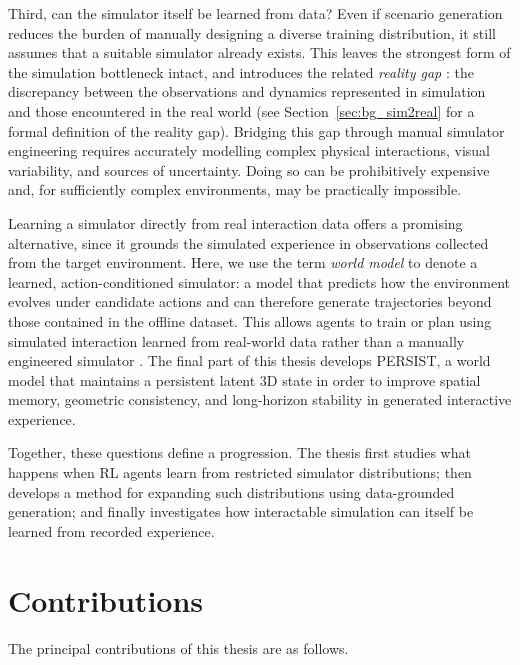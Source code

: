 Third, can the simulator itself be learned from data? Even if scenario generation reduces the burden of manually designing a diverse training distribution, it still assumes that a suitable simulator already exists. This leaves the strongest form of the simulation bottleneck intact, and introduces the related \emph{reality gap} \citep{jakobi1995noise,tobin2017domain}: the discrepancy between the observations and dynamics represented in simulation and those encountered in the real world (see Section~\ref{sec:bg_sim2real} for a formal definition of the reality gap). Bridging this gap through manual simulator engineering requires accurately modelling complex physical interactions, visual variability, and sources of uncertainty. Doing so can be prohibitively expensive and, for sufficiently complex environments, may be practically impossible.

Learning a simulator directly from real interaction data offers a promising alternative, since it grounds the simulated experience in observations collected from the target environment. Here, we use the term \textit{world model} \citep{haworldmodels2018} to denote a learned, action-conditioned simulator: a model that predicts how the environment evolves under candidate actions and can therefore generate trajectories beyond those contained in the offline dataset. This allows agents to train or plan using simulated interaction learned from real-world data rather than a manually engineered simulator \citep{hafner2025training}. The final part of this thesis develops \hbox{PERSIST}, a world model that maintains a persistent latent 3D state in order to improve spatial memory, geometric consistency, and long-horizon stability in generated interactive experience.

Together, these questions define a progression. The thesis first studies what happens when RL agents learn from restricted simulator distributions; then develops a method for expanding such distributions using data-grounded generation; and finally investigates how interactable simulation can itself be learned from recorded experience.

\section{Contributions}
\label{sec:intro_contributions}
The principal contributions of this thesis are as follows.

